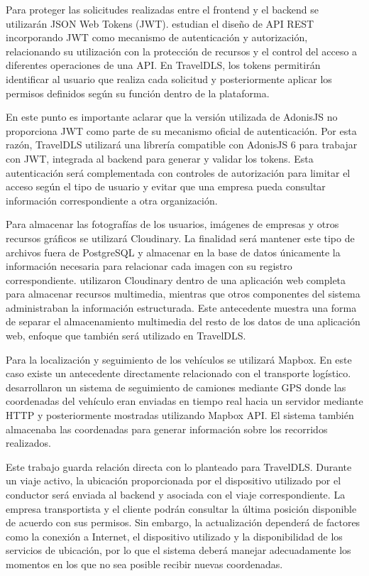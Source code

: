 Para proteger las solicitudes realizadas entre el frontend y el backend se utilizarán JSON Web Tokens (JWT). \textcite{stjepanovic2026jwt} estudian el diseño de API REST incorporando JWT como mecanismo de autenticación y autorización, relacionando su utilización con la protección de recursos y el control del acceso a diferentes operaciones de una API. En TravelDLS, los tokens permitirán identificar al usuario que realiza cada solicitud y posteriormente aplicar los permisos definidos según su función dentro de la plataforma.

En este punto es importante aclarar que la versión utilizada de AdonisJS no proporciona JWT como parte de su mecanismo oficial de autenticación. Por esta razón, TravelDLS utilizará una librería compatible con AdonisJS 6 para trabajar con JWT, integrada al backend para generar y validar los tokens. Esta autenticación será complementada con controles de autorización para limitar el acceso según el tipo de usuario y evitar que una empresa pueda consultar información correspondiente a otra organización.

Para almacenar las fotografías de los usuarios, imágenes de empresas y otros recursos gráficos se utilizará Cloudinary. La finalidad será mantener este tipo de archivos fuera de PostgreSQL y almacenar en la base de datos únicamente la información necesaria para relacionar cada imagen con su registro correspondiente. \textcite{mahishawadagi2026cloudinary} utilizaron Cloudinary dentro de una aplicación web completa para almacenar recursos multimedia, mientras que otros componentes del sistema administraban la información estructurada. Este antecedente muestra una forma de separar el almacenamiento multimedia del resto de los datos de una aplicación web, enfoque que también será utilizado en TravelDLS.

Para la localización y seguimiento de los vehículos se utilizará Mapbox. En este caso existe un antecedente directamente relacionado con el transporte logístico. \textcite{manalu2022gps} desarrollaron un sistema de seguimiento de camiones mediante GPS donde las coordenadas del vehículo eran enviadas en tiempo real hacia un servidor mediante HTTP y posteriormente mostradas utilizando Mapbox API. El sistema también almacenaba las coordenadas para generar información sobre los recorridos realizados.

Este trabajo guarda relación directa con lo planteado para TravelDLS. Durante un viaje activo, la ubicación proporcionada por el dispositivo utilizado por el conductor será enviada al backend y asociada con el viaje correspondiente. La empresa transportista y el cliente podrán consultar la última posición disponible de acuerdo con sus permisos. Sin embargo, la actualización dependerá de factores como la conexión a Internet, el dispositivo utilizado y la disponibilidad de los servicios de ubicación, por lo que el sistema deberá manejar adecuadamente los momentos en los que no sea posible recibir nuevas coordenadas.

